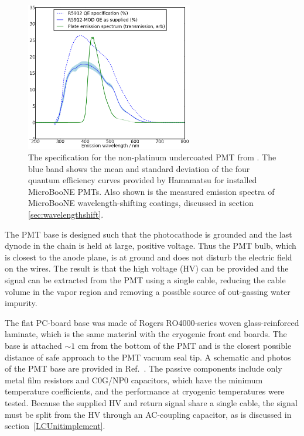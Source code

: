 \begin{figure}[t]
\centering 
\includegraphics[width=0.65\textwidth]{./light_figures/PlateSpectra.png}
\caption{The specification for the non-platinum undercoated PMT from \cite{Hamamatsu-Datasheet8inch}.  The blue band shows the mean and standard deviation of the four quantum efficiency curves provided by Hamamatsu for installed MicroBooNE PMTs. Also shown is the measured emission spectra of MicroBooNE wavelength-shifting coatings, discussed in section \ref{sec:wavelengthshift}.  \cite{Benthesis}
 \label{fig:TPBSpectraPlate}  }
\end{figure}


The PMT base is designed such that the photocathode is 
grounded and the last dynode in the chain is held at large, positive voltage. 
Thus the PMT bulb, which is closest to the \lartpc anode plane, 
is at ground and does not disturb the electric field on the wires.  
The result is that the high voltage (HV) can be provided and the signal can be extracted from the PMT using a single cable, 
reducing the cable volume in the vapor region and removing a possible source of out-gassing water impurity.

The flat PC-board base was made of Rogers RO4000-series woven glass-reinforced laminate, 
which is the same material with the \lartpc cryogenic front end boards.
The base is attached $\sim 1$ cm from the bottom of the PMT and is the closest possible distance of safe approach to the PMT vacuum seal tip.   
A schematic and photos of the PMT base are provided in Ref.~\cite{Briese:2013wua}. 
The passive components include only metal film resistors and C0G/NP0 capacitors, 
which have the minimum temperature coefficients, and the performance at cryogenic temperatures were tested.  
Because the supplied HV and return signal share a single cable, the signal must be split from the HV through an AC-coupling capacitor, as is discussed in section~\ref{LCUnitimplement}.

